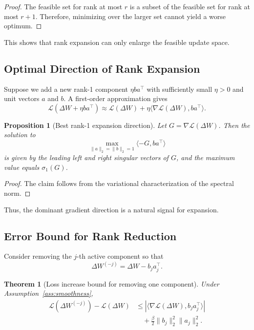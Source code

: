 \documentclass{article}
\newtheorem{theorem}{Theorem}
\newtheorem{proposition}{Proposition}
\begin{document}
\begin{proof}
The feasible set for rank at most $r$ is a subset of the feasible set for rank at most $r+1$. Therefore, minimizing over the larger set cannot yield a worse optimum.
\end{proof}

This shows that rank expansion can only enlarge the feasible update space.

\subsection{Optimal Direction of Rank Expansion}
Suppose we add a new rank-1 component $\eta ba^\top$ with sufficiently small $\eta > 0$ and unit vectors $a$ and $b$. A first-order approximation gives
\begin{equation}
    \mathcal{L}(\Delta W + \eta ba^\top)
    \approx
    \mathcal{L}(\Delta W) + \eta\langle \nabla\mathcal{L}(\Delta W), ba^\top \rangle.
\end{equation}

\begin{proposition}[Best rank-1 expansion direction]
\label{prop:best_rank1_direction}
Let $G = \nabla \mathcal{L}(\Delta W)$. Then the solution to
\begin{equation}
    \max_{\|a\|_2 = \|b\|_2 = 1} \langle -G, ba^\top \rangle
\end{equation}
is given by the leading left and right singular vectors of $G$, and the maximum value equals $\sigma_1(G)$.
\end{proposition}

\begin{proof}
The claim follows from the variational characterization of the spectral norm.
\end{proof}

Thus, the dominant gradient direction is a natural signal for expansion.

\subsection{Error Bound for Rank Reduction}
Consider removing the $j$-th active component so that
\begin{equation}
    \Delta W^{(-j)} = \Delta W - b_j a_j^\top.
\end{equation}

\begin{theorem}[Loss increase bound for removing one component]
\label{thm:pruning_bound}
Under Assumption~\ref{ass:smoothness},
\begin{equation}
\label{eq:pruning_bound}
\begin{aligned}
    \mathcal{L}(\Delta W^{(-j)}) - \mathcal{L}(\Delta W)
    &\le \left|\langle \nabla\mathcal{L}(\Delta W), b_j a_j^\top \rangle\right| \\
    &\quad + \frac{\beta}{2}\|b_j\|_2^2\|a_j\|_2^2.
\end{aligned}
\end{equation}
\end{theorem}
\end{document}
